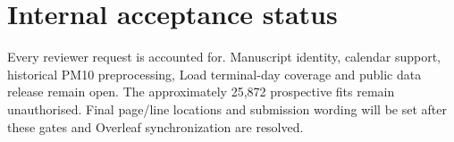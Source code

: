 \documentclass[11pt,a4paper]{article}
\begin{document}
\section*{Internal acceptance status}
Every reviewer request is accounted for. Manuscript identity, calendar
support, historical PM10 preprocessing, Load terminal-day coverage and public
data release remain open. The approximately 25,872 prospective fits remain
unauthorised. Final page/line locations and submission wording will be set
after these gates and Overleaf synchronization are resolved.
\end{document}
